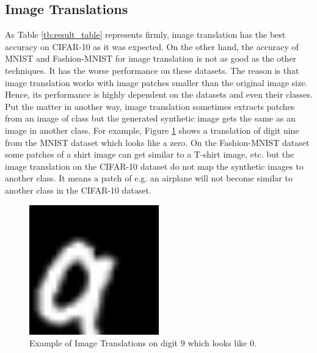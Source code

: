 \subsection{Image Translations}
As Table \ref{tb:result_table} represents firmly, image translation has the best accuracy on CIFAR-10 as it
was expected. On the other hand, the accuracy of MNIST and Fashion-MNIST for image translation is not
as good as the other techniques. It has the worse performance on these datasets. The reason is
that image translation works with image patches smaller than the original image size. Hence, its
performance is highly dependent on the datasets and even their classes. Put the matter in another
way, image translation sometimes extracts patches from an image of class but the generated synthetic
image gets the same as an image in another class. For example, Figure \ref{fig:image_translation_example_bad_accuracy} shows a translation of
digit nine from the MNIST dataset which looks like a zero. On the Fashion-MNIST dataset some patches
of a shirt image can get similar to a T-shirt image, etc. but the image translation on the CIFAR-10
dataset do not map the synthetic images to another class. It means a patch of e.g. an airplane will
not become similar to another class in the CIFAR-10 dataset.
\begin{figure}
  \centering
  \label{fig:image_translation_example_bad_accuracy}
  \includegraphics[width=0.5\textwidth]{fig/result/Image_translations_mnist}
  \caption{Example of Image Translations on digit $9$ which looks like $0$.}
\end{figure}

